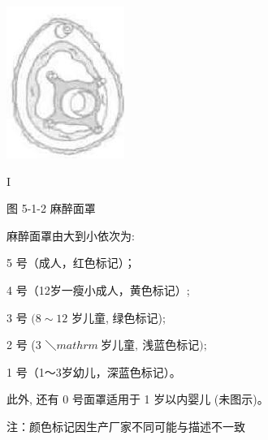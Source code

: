 \documentclass[10pt]{article}
\begin{document}
\begin{center}
\includegraphics[max width=\textwidth]{2024_07_05_645bb794a4d4f32ee0c8g-283}
\end{center}

I

图 5-1-2 麻醉面罩

麻醉面罩由大到小依次为:

5 号（成人，红色标记）；

4 号（12岁一瘦小成人，黄色标记）;

3 号 $(8 \sim 12$ 岁儿童, 绿色标记);

2 号 (3 $＼mathrm{~ 岁 儿 童, ~ 浅 蓝 色 标 记) ; ~}$

1 号（1～3岁幼儿，深蓝色标记）。

此外, 还有 0 号面罩适用于 1 岁以内婴儿 (未图示)。

注：颜色标记因生产厂家不同可能与描述不一致
\end{document}
